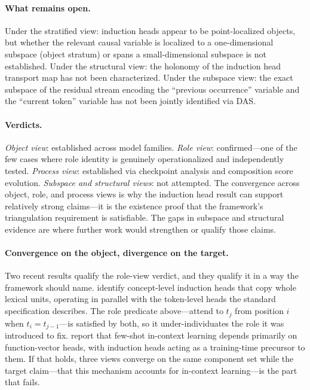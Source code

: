 \documentclass{article}
\begin{document}
\paragraph{What remains open.}
Under the stratified view: induction heads appear to be point-localized
objects, but whether the relevant causal variable is localized to a
one-dimensional subspace (object stratum) or spans a small-dimensional
subspace is not established.  Under the structural view: the holonomy
of the induction head transport map has not been characterized.  Under
the subspace view: the exact subspace of the residual stream encoding
the ``previous occurrence'' variable and the ``current token'' variable
has not been jointly identified via DAS.

\paragraph{Verdicts.}
\emph{Object view}: established across model families.
\emph{Role view}: confirmed---one of the few cases where role identity
is genuinely operationalized and independently tested.
\emph{Process view}: established via checkpoint analysis and composition
score evolution.
\emph{Subspace and structural views}: not attempted.
The convergence across object, role, and process views is why the
induction head result can support relatively strong claims---it is the
existence proof that the framework's triangulation requirement is
satisfiable.  The gaps in subspace and structural evidence are where
further work would strengthen or qualify those claims.

\paragraph{Convergence on the object, divergence on the target.}
Two recent results qualify the role-view verdict, and they qualify it in
a way the framework should name.  \citet{feucht2025} identify
concept-level induction heads that copy whole lexical units, operating in
parallel with the token-level heads the standard specification
describes.  The role predicate above---attend to $t_j$ from position $i$
when $t_i = t_{j-1}$---is satisfied by both, so it under-individuates the
role it was introduced to fix.  \citet{yin2025} report that few-shot
in-context learning depends primarily on function-vector heads, with
induction heads acting as a training-time precursor to them.  If that
holds, three views converge on the same component set while the target
claim---that this mechanism accounts for in-context learning---is the
part that fails.
\end{document}
